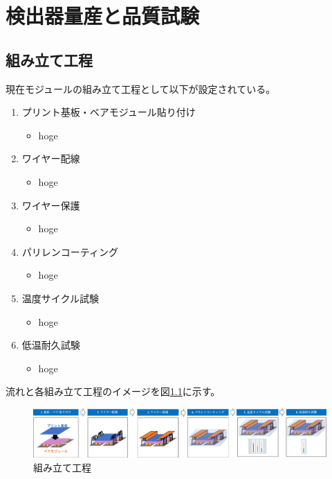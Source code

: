 \chapter{検出器量産と品質試験}

\section{組み立て工程}
現在モジュールの組み立て工程として以下が設定されている。
\begin{enumerate}
  \item プリント基板・ベアモジュール貼り付け
  \begin{itemize}
    \item hoge
  \end{itemize}
  \item ワイヤー配線
  \begin{itemize}
    \item hoge
  \end{itemize}
  \item ワイヤー保護
  \begin{itemize}
    \item hoge
  \end{itemize}
  \item パリレンコーティング
  \begin{itemize}
    \item hoge
  \end{itemize}
  \item 温度サイクル試験
  \begin{itemize}
    \item hoge
  \end{itemize}
  \item 低温耐久試験
  \begin{itemize}
    \item hoge
  \end{itemize}
\end{enumerate}

流れと各組み立て工程のイメージを図\ref{assembly_flow}に示す。
\begin{figure}[bpt]\centering
\includegraphics[width=14cm]{assembly_flow}
\caption[組み立て工程]{組み立て工程}
\label{assembly_flow}
\end{figure}

